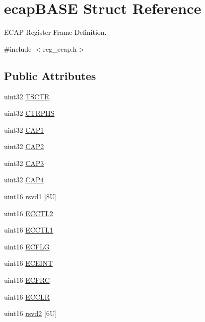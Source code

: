 \hypertarget{structecapBASE}{}\section{ecap\+B\+A\+SE Struct Reference}
\label{structecapBASE}


E\+C\+AP Register Frame Definition.  




{\ttfamily \#include $<$reg\+\_\+ecap.\+h$>$}

\subsection*{Public Attributes}
\begin{DoxyCompactItemize}
\item 
uint32 \mbox{\hyperlink{structecapBASE_af4dec4a7fa08794456ac2c4616c96176}{T\+S\+C\+TR}}
\item 
uint32 \mbox{\hyperlink{structecapBASE_a5834c54556875dc112d0d056f80a2d84}{C\+T\+R\+P\+HS}}
\item 
uint32 \mbox{\hyperlink{structecapBASE_a92fe25ec478d4b189b5aad15d1e97db4}{C\+A\+P1}}
\item 
uint32 \mbox{\hyperlink{structecapBASE_a69977a6ca4d32465b98d7c88dfc69c52}{C\+A\+P2}}
\item 
uint32 \mbox{\hyperlink{structecapBASE_a0e5c07b96ba29809c82e6f5e2473766b}{C\+A\+P3}}
\item 
uint32 \mbox{\hyperlink{structecapBASE_a841215fcded187c745e42a07d895f4d1}{C\+A\+P4}}
\item 
uint16 \mbox{\hyperlink{structecapBASE_ae082d4b14e1e70d3549b55c86716d724}{rsvd1}} \mbox{[}8\+U\mbox{]}
\item 
uint16 \mbox{\hyperlink{structecapBASE_a32f049b17a2f2c280ccffe6277d6b48c}{E\+C\+C\+T\+L2}}
\item 
uint16 \mbox{\hyperlink{structecapBASE_a0869d5446fa48a235df4d3dcb7110697}{E\+C\+C\+T\+L1}}
\item 
uint16 \mbox{\hyperlink{structecapBASE_ab9e1c5e3ba6bf7ce54365b0cc33beeb0}{E\+C\+F\+LG}}
\item 
uint16 \mbox{\hyperlink{structecapBASE_a74012d8211945e6c7d7e735a801daa52}{E\+C\+E\+I\+NT}}
\item 
uint16 \mbox{\hyperlink{structecapBASE_a0e89e6b9dc28759e72c90ac27d232f68}{E\+C\+F\+RC}}
\item 
uint16 \mbox{\hyperlink{structecapBASE_a618822a04289061e3283a6b2e7096b11}{E\+C\+C\+LR}}
\item 
uint16 \mbox{\hyperlink{structecapBASE_a2587e08a0ce761a5b5112a6f0c37fc3c}{rsvd2}} \mbox{[}6\+U\mbox{]}
\end{DoxyCompactItemize}



